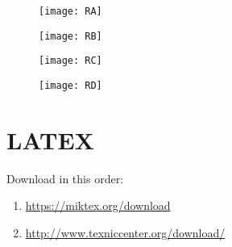 \documentclass[letterpaper,11pt]{article}
\begin{document}
	\begin{figure}[htbp]
		\centering
			\texttt{[image: RA]}
	\end{figure}
	
	\begin{figure}[htbp]
		\centering
			\texttt{[image: RB]}
	\end{figure}
	
	\begin{figure}[htbp]
		\centering
			\texttt{[image: RC]}
	\end{figure}
		
	\begin{figure}[htbp]
		\centering
			\texttt{[image: RD]}
	\end{figure}
			
\newpage

\section{LATEX}

Download in this order:

\begin{enumerate}
	\item \url{https://miktex.org/download}
	\item \url{http://www.texniccenter.org/download/}
\end{enumerate}

\end{document}
